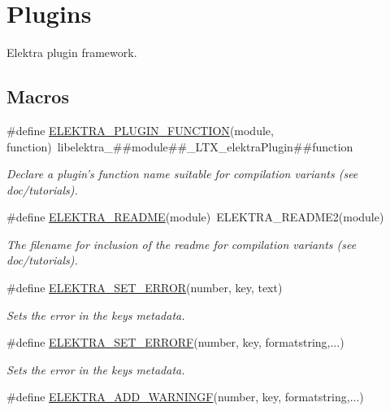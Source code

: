 \hypertarget{group__plugin}{\section{Plugins}
\label{group__plugin}
}


Elektra plugin framework.  


\subsection*{Macros}
\begin{DoxyCompactItemize}
\item 
\#define \hyperlink{group__plugin_ga34d1a66f0a6e89cfd20f4014a9975a2a}{E\-L\-E\-K\-T\-R\-A\-\_\-\-P\-L\-U\-G\-I\-N\-\_\-\-F\-U\-N\-C\-T\-I\-O\-N}(module, function)~libelektra\-\_\-\#\#module\#\#\-\_\-\-L\-T\-X\-\_\-elektra\-Plugin\#\#function
\begin{DoxyCompactList}\small\item\em Declare a plugin's function name suitable for compilation variants (see doc/tutorials). \end{DoxyCompactList}\item 
\#define \hyperlink{group__plugin_ga78d616f68bf9fb0942f66478597467c6}{E\-L\-E\-K\-T\-R\-A\-\_\-\-R\-E\-A\-D\-M\-E}(module)~E\-L\-E\-K\-T\-R\-A\-\_\-\-R\-E\-A\-D\-M\-E2(module)
\begin{DoxyCompactList}\small\item\em The filename for inclusion of the readme for compilation variants (see doc/tutorials). \end{DoxyCompactList}\item 
\#define \hyperlink{group__plugin_gaab1842b82272e6d4235b6a71587a64d9}{E\-L\-E\-K\-T\-R\-A\-\_\-\-S\-E\-T\-\_\-\-E\-R\-R\-O\-R}(number, key, text)
\begin{DoxyCompactList}\small\item\em Sets the error in the keys metadata. \end{DoxyCompactList}\item 
\#define \hyperlink{group__plugin_ga3e4fc2c20d8e64bed7a54bb1af882e34}{E\-L\-E\-K\-T\-R\-A\-\_\-\-S\-E\-T\-\_\-\-E\-R\-R\-O\-R\-F}(number, key, formatstring,...)
\begin{DoxyCompactList}\small\item\em Sets the error in the keys metadata. \end{DoxyCompactList}\item 
\#define \hyperlink{group__plugin_ga2bbb3bc3a3bdaf5b34b52de81886a098}{E\-L\-E\-K\-T\-R\-A\-\_\-\-A\-D\-D\-\_\-\-W\-A\-R\-N\-I\-N\-G\-F}(number, key, formatstring,...)

\end{DoxyCompactItemize}
